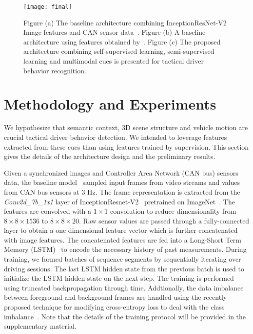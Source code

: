 \documentclass[10pt,twocolumn,letterpaper]{article}
\begin{document}
\setlength{\belowcaptionskip}{-10.5pt}

\begin{figure*}
\label{baseline2}
\begin{center}
\texttt{[image: final]}
   \caption{Figure (a) The baseline architecture combining InceptionResNet-V2 Image features and CAN sensor data~\cite{RamanishkaCVPR2018}. 
Figure (b) A baseline architecture using features obtained by~\cite{santana2016learning}. Figure (c) The proposed architecture combining self-supervised learning, semi-supervised learning and multimodal cues is presented for tactical driver behavior recognition.}
\end{center}   
\end{figure*}



\section{Methodology and Experiments}
 

We hypothesize that semantic context, 3D scene structure and vehicle motion are crucial tactical driver behavior detection. We intended to leverage features extracted from these cues than using features trained by supervision. This section gives the details of the architecture design and the preliminary results. 

Given a synchronized images and Controller
 Area Network (CAN bus) sensors data, the baseline model~\cite{RamanishkaCVPR2018} sampled input frames from video streams and values from CAN bus sensors at 3 Hz. The frame representation is extracted from the \textit{Conv2d\_7b\_1x1} layer of InceptionResnet-V2~\cite{SzegedyIV16} pretrained on ImageNet~\cite{Deng09imagenet}. The features are convolved with a $1 \times 1$ convolution to reduce
dimensionality from $8 \times 8 \times 1536$ to
$8 \times 8 \times 20$. Raw sensor values are passed through a fully-connected layer to obtain a one dimensional feature vector which is further concatenated with image features.
The concatenated features are fed into a Long-Short Term Memory (LSTM)~\cite{Hochreiter:1997:LSM:1246443.1246450} to encode the necessary history of past measurements. %
During training, we formed batches of sequence segments by sequentially iterating over driving sessions. The last LSTM hidden state from the previous batch is used to initialize the LSTM hidden state on the next step. The training is performed using truncated backpropagation through time. Addtionally, the data imbalance between foreground and background frames are handled using the recently proposed technique for modifying cross-entropy loss to deal with the class imbalance~\cite{Lin2017b}. Note that the details of the training protocol will be provided in the supplementary material.
\end{document}

